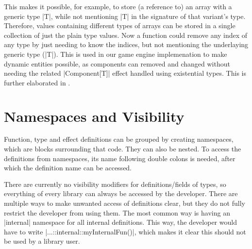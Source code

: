This makes it possible, for example, to store (a reference to) an array with a generic type |T|, while not mentioning |T| in the signature of that variant's type. Therefore, values containing different types of arrays can be stored in a single collection of just the plain type values. Now a function could remove any index of any type by just needing to know the indices, but not mentioning the underlaying generic type (|T|). This is used in our game engine implemenation to make dynamic entities possible, as components can removed and changed without needing the related |Component[T]| effect handled using existential types. This is further elaborated in .

\section{Namespaces and Visibility}

Function, type and effect definitions can be grouped by creating namespaces, which are blocks surrounding that code. They can also be nested. To access the definitions from namespaces, its name following double colons is needed, after which the definition name can be accessed.

There are currently no visibility modifiers for definitions/fields of types, so everything of every library can always be accessed by the developer. There are multiple ways to make unwanted access of definitions clear, but they do not fully restrict the developer from using them. The most common way is having an |internal| namespace for all internal definitions. This way, the developer would have to write |...::internal::myInternalFun()|, which makes it clear this should not be used by a library user.
